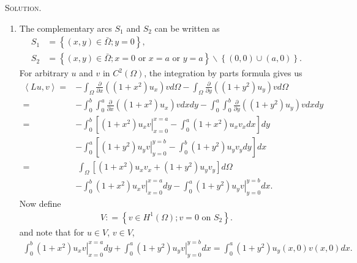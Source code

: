 \documentclass[11pt,a4paper]{article}
\numberwithin{equation}{section}
\numberwithin{equation}{section}
\begin{document}
\noindent 
\textsc{Solution.}
\begin{enumerate}
\item The complementary arcs $S_1$ and $S_2$ can be written as 
\begin{align}
{S_1} &= \left\{ {\left( {x,y} \right) \in \bar \Omega ;y = 0} \right\},\\
{S_2} &= \left\{ {\left( {x,y} \right) \in \bar \Omega ;x = 0 \mbox{ or } x = a \mbox{ or } y = a} \right\}\backslash \left\{ {\left( {0,0} \right) \cup \left( {a,0} \right)} \right\} .
\end{align}
For arbitrary $u$ and $v$ in $C^2\left(\Omega\right)$, the integration by parts formula gives us
\begin{align}
\left\langle {Lu,v} \right\rangle  =&  - \int_\Omega  {\frac{\partial }{{\partial x}}\left( {\left( {1 + {x^2}} \right){u_x}} \right)vd\Omega }  - \int_\Omega  {\frac{\partial }{{\partial y}}\left( {\left( {1 + {y^2}} \right){u_y}} \right)vd\Omega } \\
 =&  - \int_0^b {\int_0^a {\frac{\partial }{{\partial x}}\left( {\left( {1 + {x^2}} \right){u_x}} \right)vdxdy} }  - \int_0^a {\int_0^b {\frac{\partial }{{\partial y}}\left( {\left( {1 + {y^2}} \right){u_y}} \right)vdxdy} } \\
 =&  - \int_0^b {\left[ {\left. {\left( {1 + {x^2}} \right){u_x}v} \right|_{x = 0}^{x = a} - \int_0^a {\left( {1 + {x^2}} \right){u_x}{v_x}dx} } \right]dy} \\
& - \int_0^a {\left[ {\left. {\left( {1 + {y^2}} \right){u_y}v} \right|_{y = 0}^{y = b} - \int_0^b {\left( {1 + {y^2}} \right){u_y}{v_y}dy} } \right]dx} \\
 =&\ \int_\Omega  {\left[ {\left( {1 + {x^2}} \right){u_x}{v_x} + \left( {1 + {y^2}} \right){u_y}{v_y}} \right]d\Omega } \\
& - \int_0^b {\left. {\left( {1 + {x^2}} \right){u_x}v} \right|_{x = 0}^{x = a}dy}  - \int_0^a {\left. {\left( {1 + {y^2}} \right){u_y}v} \right|_{y = 0}^{y = b}dx} .
\end{align}
Now define 
\begin{align}
V: = \left\{ {v \in {H^1}\left( \Omega  \right);v = 0 \mbox{ on } {S_2}} \right\}.
\end{align}
and note that for $u \in V$, $v\in V$, 
\begin{align}
\int_0^b {\left. {\left( {1 + {x^2}} \right){u_x}v} \right|_{x = 0}^{x = a}dy}  + \int_0^a {\left. {\left( {1 + {y^2}} \right){u_y}v} \right|_{y = 0}^{y = b}dx}  = \int_0^a {\left( {1 + {y^2}} \right){u_y}\left( {x,0} \right)v\left( {x,0} \right)dx} .

\end{align}
\end{enumerate}
\end{document}
